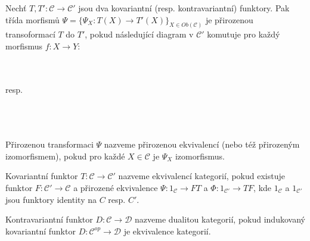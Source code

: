     \begin{dfn}
      Nechť $T,T':\mathcal C\to \mathcal C'$ jsou dva kovariantní (resp. kontravariantní) 
      funktory. Pak třída 
      morfismů $\Psi=\{\Psi_X:T(X)\to T'(X)\}_{X\in Ob(\mathcal C)}$ je 
      přirozenou transoformací $T$ do $T'$, pokud následující 
      diagram v $\mathcal C'$ komutuje pro každý morfismus $f:X\to Y$: \\\\
            \centerline{\\
             resp.\\             
             }
             \\\\\\
      Přirozenou transformaci $\Psi$ nazveme přirozenou ekvivalencí 
      (nebo též přirozeným izomorfismem), pokud 
      pro každé $X\in \mathcal C$ je $\Psi_X$ izomorfismus.
      
      Kovariantní funktor $T:\mathcal C\to \mathcal C'$ nazveme ekvivalencí 
      kategorií, pokud existuje funktor $F:\mathcal C'\to \mathcal C$ a 
      přirozené ekvivalence $\Psi:1_{\mathcal C}\to FT$ a $\Phi:1_{\mathcal C'}\to 
      TF$, kde $1_{\mathcal C}$ a $1_{\mathcal C'}$ jsou funktory identity na $C$ resp. $C'$.
      
      Kontravariantní funktor $D:\mathcal C\to \mathcal D$ nazveme dualitou 
      kategorií, pokud indukovaný kovariantní funktor $D:\mathcal C^{op}\to \mathcal D$ 
      je ekvivalence kategorií.
    \end{dfn}
    
